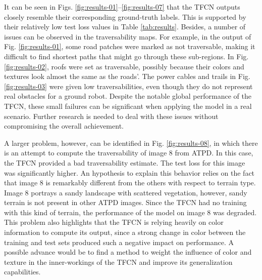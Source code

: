 \documentclass[conference]{IEEEtran}
\begin{document}
It can be seen in Figs. \ref{fig:results-01}--\ref{fig:results-07} that the TFCN outputs closely resemble their corresponding ground-truth labels.
This is supported by their relatively low test loss values in Table \ref{tab:results}.
Besides, a number of issues can be observed in the traversability maps.
For example, in the output of Fig. \ref{fig:results-01}, some road patches were marked as not traversable, making it difficult to find shortest paths that might go through these sub-regions.
In Fig. \ref{fig:results-02}, roofs were set as traversable, possibly because their colors and textures look almost the same as the roads'.
The power cables and trails in Fig. \ref{fig:results-03} were given low traversabilities, even though they do not represent real obstacles for a ground robot.
Despite the notable global performance of the TFCN, these small failures can be significant when applying the model in a real scenario.
Further research is needed to deal with these issues without compromising the overall achievement.

A larger problem, however, can be identified in Fig. \ref{fig:results-08}, in which there is an attempt to compute the traversability of image 8 from ATPD.
In this case, the TFCN provided a bad traversability estimate.
The test loss for this image was significantly higher.
An hypothesis to explain this behavior relies on the fact that image 8 is remarkably different from the others with respect to terrain type.
Image 8 portrays a sandy landscape with scattered vegetation, however, sandy terrain is not present in other ATPD images.
Since the TFCN had no training with this kind of terrain, the performance of the model on image 8 was degraded.
This problem also highlights that the TFCN is relying heavily on color information to compute its output, since a strong change in color between the training and test sets produced such a negative impact on performance.
A possible advance would be to find a method to weight the influence of color and texture in the inner-workings of the TFCN and improve its generalization capabilities.
\end{document}
